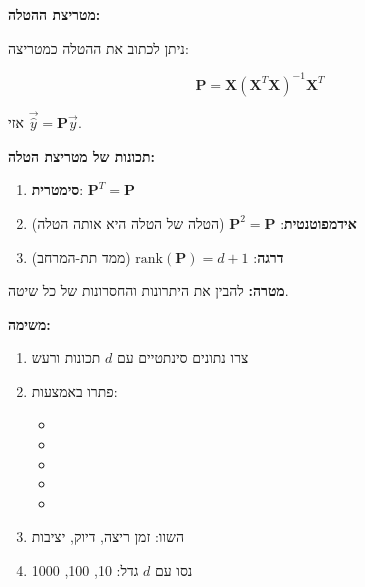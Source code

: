 \textbf{מטריצת ההטלה:}

ניתן לכתוב את ההטלה כמטריצה:

\begin{equation}
\mathbf{P} = \mathbf{X}(\mathbf{X}^T\mathbf{X})^{-1}\mathbf{X}^T
\end{equation}

אזי $\vec{\hat{y}} = \mathbf{P}\vec{y}$.

\textbf{תכונות של מטריצת הטלה:}

\begin{enumerate}
\item \textbf{סימטרית}: $\mathbf{P}^T = \mathbf{P}$
\item \textbf{אידמפוטנטית}: $\mathbf{P}^2 = \mathbf{P}$ (הטלה של הטלה היא אותה הטלה)
\item \textbf{דרגה}: $\text{rank}(\mathbf{P}) = d+1$ (ממד תת-המרחב)
\end{enumerate}


\textbf{מטרה:} להבין את היתרונות והחסרונות של כל שיטה.

\textbf{משימה:}

\begin{enumerate}
\item צרו נתונים סינתטיים עם $d$ תכונות ורעש
\item פתרו באמצעות:
\begin{itemize}
\item {}
\item {}
\item {}
\item {}
\item {}
\end{itemize}
\item השוו: זמן ריצה, דיוק, יציבות
\item נסו עם $d$ גדל: \num{10}, \num{100}, \num{1000}
\end{enumerate}

